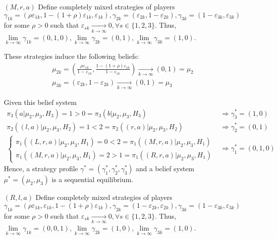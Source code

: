 \documentclass[]{article}
\begin{document}
\begin{itemize}
	\item[$(M, r, a)$] Define completely mixed strategies of players $\gamma_{1k} = (\rho\varepsilon_{1k}, 1 - (1 + \rho)\varepsilon_{1k}, \varepsilon_{1k}), \gamma_{2k} = (\varepsilon_{2k}, 1 - \varepsilon_{2k}), \gamma_{3k} = (1 - \varepsilon_{3k}, \varepsilon_{3k})$ for some $\rho > 0$ such that $\varepsilon_{sk}\underset{k\to\infty}{\longrightarrow}0, \forall s\in\{1,2,3\}$. Thus, $\lim\limits_{k\to\infty}\gamma_{1k} = (0, 1, 0), \lim\limits_{k\to\infty}\gamma_{2k} = (0, 1), \lim\limits_{k\to\infty}\gamma_{3k} = (1, 0)$.
	
	These strategies induce the following beliefs:
	\begin{equation}
		\begin{split}
			\mu_{2k} = (\frac{\rho\varepsilon_{1k}}{1 - \varepsilon_{1k}}, \frac{1 - (1 + \rho)\varepsilon_{1k}}{1 - \varepsilon_{1k}}) \underset{k\to\infty}{\longrightarrow} (0, 1) = \mu_2 \\ \nonumber
			\mu_{3k} = (\varepsilon_{2k}, 1 - \varepsilon_{2k}) \underset{k\to\infty}{\longrightarrow} (0, 1) = \mu_3 
		\end{split}
	\end{equation}
	
	Given this belief system
	\begin{equation}
		\begin{split}
			\pi_3(a|\mu_2, \mu_3, H_3) = 1 > 0 = \pi_3(b|\mu_2, \mu_3, H_3) &\Rightarrow \gamma_3^* = (1, 0) \\ \nonumber
			\pi_2((l, a)|\mu_2, \mu_3, H_2) = 1 < 2 = \pi_2((r, a)|\mu_2, \mu_3, H_2) &\Rightarrow \gamma_2^* = (0, 1) \\
			\begin{cases}
			\pi_1((L, r, a)|\mu_2, \mu_3, H_1) = 0 < 2 = \pi_1((M, r, a)|\mu_2, \mu_3, H_1) \\
			\pi_1((M, r, a)|\mu_2, \mu_3, H_1) = 2 > 1 = \pi_1((R, r, a)|\mu_2, \mu_3, H_1)
			\end{cases} &\Rightarrow \gamma_1^* = (0, 1, 0)
		\end{split}
	\end{equation}
	Hence, a strategy profile $\gamma^* = (\gamma_1^*, \gamma_2^*, \gamma_3^*)$ and a belief system $\mu^* = (\mu_2, \mu_3)$ is a sequential equilibrium.
	
	\item[$(R, l, a)$] Define completely mixed strategies of players $\gamma_{1k} = (\rho\varepsilon_{1k}, \varepsilon_{1k}, 1 - (1 + \rho)\varepsilon_{1k}), \gamma_{2k} = (1 - \varepsilon_{2k}, \varepsilon_{2k}), \gamma_{3k} = (1 - \varepsilon_{3k}, \varepsilon_{3k})$ for some $\rho > 0$ such that $\varepsilon_{sk}\underset{k\to\infty}{\longrightarrow}0, \forall s\in\{1,2,3\}$. Thus, $\lim\limits_{k\to\infty}\gamma_{1k} = (0, 0, 1), \lim\limits_{k\to\infty}\gamma_{2k} = (1, 0), \lim\limits_{k\to\infty}\gamma_{3k} = (1, 0)$.
	

\end{itemize}
\end{document}
